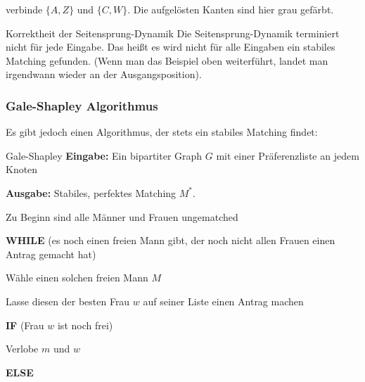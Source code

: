 \documentclass{panikzettel}
\newcommand\tab[1][1cm]{\hspace*{#1}}
\begin{document}
{\begin{halfboxr}
\begin{center}
	\end{center}
	verbinde $\{A,Z\}$ und $\{C,W\}$. Die aufgelösten Kanten sind hier grau gefärbt.
\end{halfboxr}


\begin{theo}{Korrektheit der Seitensprung-Dynamik}
	Die Seitensprung-Dynamik terminiert nicht für jede Eingabe. Das heißt es wird nicht für alle Eingaben ein stabiles Matching gefunden. (Wenn man das Beispiel oben weiterführt, landet man irgendwann wieder an der Ausgangsposition).
\end{theo}

\subsubsection{Gale-Shapley Algorithmus}

Es gibt jedoch einen Algorithmus, der stets ein stabiles Matching findet:

\begin{algo}{Gale-Shapley}
	\textbf{Eingabe:} Ein bipartiter Graph $G$ mit einer Präferenzliste an jedem Knoten
	
	\textbf{Ausgabe:} Stabiles, perfektes Matching $M^*$.
	\tcblower
	
	Zu Beginn sind alle Männer und Frauen ungematched
	
	\textbf{WHILE} (es noch einen freien Mann gibt, der noch nicht allen Frauen einen Antrag gemacht hat)
	
	\tab Wähle einen solchen freien Mann $M$
	
	\tab Lasse diesen der besten Frau $w$ auf seiner Liste einen Antrag machen
	
	\tab \textbf{IF} (Frau $w$ ist noch frei)
	
	\tab\tab Verlobe $m$ und $w$
	
	\tab \textbf{ELSE} 
	

\end{algo}}
\end{document}
